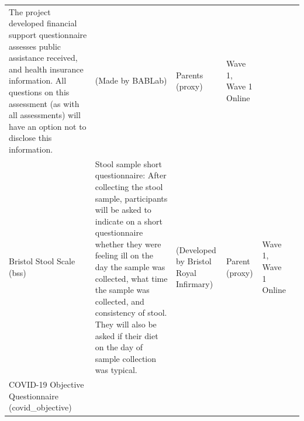 \documentclass[
]{book}
\begin{document}
\begin{longtable}[]{@{}llllll@{}}
\begin{minipage}[t]{0.18\columnwidth}
The project developed financial support questionnaire assesses public assistance received, and health insurance information. All questions on this assessment (as with all assessments) will have an option not to disclose this information.\strut
\end{minipage} & \begin{minipage}[t]{0.15\columnwidth}\raggedright
(Made by BABLab)\strut
\end{minipage} & \begin{minipage}[t]{0.16\columnwidth}\raggedright
Parents (proxy)\strut
\end{minipage} & \begin{minipage}[t]{0.06\columnwidth}\raggedright
Wave 1, Wave 1 Online\strut
\end{minipage} & \begin{minipage}[t]{0.10\columnwidth}\raggedright
\strut
\end{minipage}\tabularnewline
\begin{minipage}[t]{0.18\columnwidth}\raggedright
Bristol Stool Scale (bss)\strut
\end{minipage} & \begin{minipage}[t]{0.18\columnwidth}\raggedright
Stool sample short questionnaire: After collecting the stool sample, participants will be asked to indicate on a short questionnaire whether they were feeling ill on the day the sample was collected, what time the sample was collected, and consistency of stool. They will also be asked if their diet on the day of sample collection was typical.\strut
\end{minipage} & \begin{minipage}[t]{0.15\columnwidth}\raggedright
(Developed by Bristol Royal Infirmary)\strut
\end{minipage} & \begin{minipage}[t]{0.16\columnwidth}\raggedright
Parent (proxy)\strut
\end{minipage} & \begin{minipage}[t]{0.06\columnwidth}\raggedright
Wave 1, Wave 1 Online\strut
\end{minipage} & \begin{minipage}[t]{0.10\columnwidth}\raggedright
\strut
\end{minipage}\tabularnewline
\begin{minipage}[t]{0.18\columnwidth}\raggedright
COVID-19 Objective Questionnaire (covid\_objective)\strut
\end{minipage} & \begin{minipage}[t]{0.18\columnwidth}\raggedright

\end{minipage}
\end{longtable}
\end{document}
